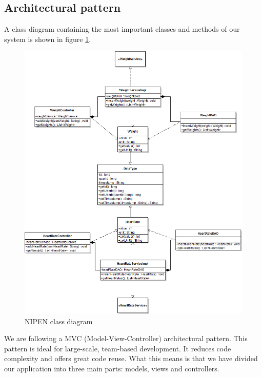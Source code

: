 \subsection{Architectural pattern}

A class diagram containing the most important classes and methods of our system is shown in figure \ref{figure:nipen-class-diagram}.

\begin{figure}[h]
\centering
\includegraphics[scale=0.5]{../Figures/NIPEN-class-diagram.png}
\caption{NIPEN class diagram}
\label{figure:nipen-class-diagram}
\end{figure}

We are following a MVC (Model-View-Controller) architectural pattern. 
This pattern is ideal for large-scale, team-based development.
It reduces code complexity and offers great code reuse. 
What this means is that we have divided our application into three main parts: models, views and controllers.

